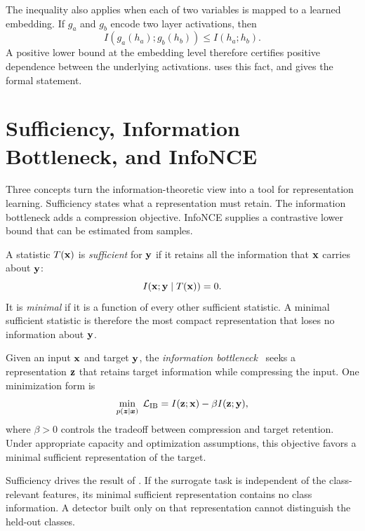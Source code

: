 The inequality also applies when each of two variables is mapped to a learned
embedding. If $g_a$ and $g_b$ encode two layer activations, then
\[
  I(g_a(h_a);g_b(h_b))\le I(h_a;h_b).
\]
A positive lower bound at the embedding level therefore certifies positive
dependence between the underlying activations. 
uses this fact, and  gives the formal statement.

\section{Sufficiency, Information Bottleneck, and InfoNCE}
\label{sec:bg:ib}

Three concepts turn the information-theoretic view into a tool for representation
learning. Sufficiency states what a representation must retain. The information
bottleneck adds a compression objective. InfoNCE supplies a contrastive lower bound
that can be estimated from samples.

\begin{definition}
A statistic $T({\mathbf{x}})$ is \emph{sufficient} for ${\mathbf{y}}$ if it retains all the
information that ${\mathbf{x}}$ carries about ${\mathbf{y}}$:
\[
  I({\mathbf{x}};{\mathbf{y}}\mid T({\mathbf{x}}))=0.
\]
It is \emph{minimal} if it is a function of every other sufficient statistic. A
minimal sufficient statistic is therefore the most compact representation that
loses no information about ${\mathbf{y}}$.
\label{def:bg:mss}
\end{definition}

\begin{definition}
Given an input ${\mathbf{x}}$ and target ${\mathbf{y}}$, the \emph{information
bottleneck}~\citep{tishby2000information} seeks a representation ${\mathbf{z}}$ that
retains target information while compressing the input. One minimization form is
\[
  \min_{p({\bm{z}}\mid{\bm{x}})}\;
  \mathcal{L}_{\mathrm{IB}}
  = I({\mathbf{z}};{\mathbf{x}})-\beta I({\mathbf{z}};{\mathbf{y}}),
\]
where $\beta>0$ controls the tradeoff between compression and target retention.
Under appropriate capacity and optimization assumptions, this objective favors a
minimal sufficient representation of the target.
\label{def:bg:ib}
\end{definition}

Sufficiency drives the result of . If the surrogate task
is independent of the class-relevant features, its minimal sufficient
representation contains no class information. A detector built only on that
representation cannot distinguish the held-out classes.

